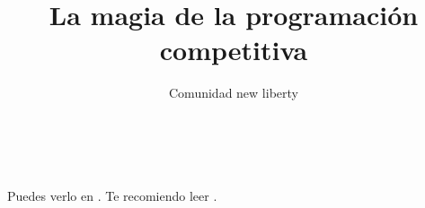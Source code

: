 \documentclass[11pt,a4paper]{book}
\author{Comunidad new liberty}
\title{La magia de la programación competitiva}
\begin{document}


\maketitle
\tableofcontents
\cleardoublepage
{}
\listoffigures
\cleardoublepage
{}
\listoftables
\cleardoublepage





\\
\\
Puedes verlo en \cite{Patricio2011}. Te recomiendo leer \cite{Patricio2011, Zacarias2009, Alfonso2010b, Alfonso2010a}.
\cleardoublepage
{}

\end{document}
